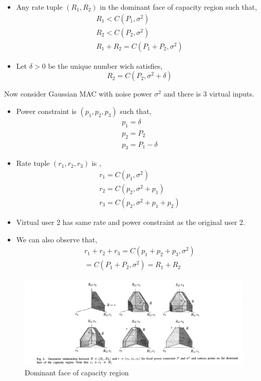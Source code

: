 \documentclass[10pt]{beamer}
\begin{document}
\begin{frame}[t]
	\begin{itemize}
	\item Any rate tuple $(R_1, R_2)$ in the dominant face of capacity region such that,
	\begin{align*}
	    R_1< C(P_1, \sigma^2)\\
		R_2 < C(P_2, \sigma^2) \\
		R_1+ R_2 = C(P_1 +P_2 , \sigma^2)
	\end{align*}
\item Let $\delta>0$ be the unique number wich satisfies,
\begin{equation}
	R_2 = C(P_2, \sigma^2 + \delta)
\end{equation}
\end{itemize}
\end{frame}
\begin{frame}[t]
	Now consider Gaussian MAC with noise power $\sigma^2$ and there is 3 virtual inputs.
	\begin{itemize}
		\item Power constraint is $(p_1,p_2,p_3)$ such that, 
		\begin{align*}
			p_1 = \delta\\ p_2 = P_2 \\ p_3 = P_1 -\delta
		\end{align*}
		\item Rate tuple $\left( r_1, r_2, r_3\right)$ is ,
		\begin{align*}
			r_1 = C(p_1,  \sigma^2)\\ r_2 = C (p_2, \sigma^2 +p_1) \\r_3 =C (p_2, \sigma^2 +p_1+p_2)
		\end{align*}
		\item Virtual user 2 has same rate and power constraint as the original user 2.
		\item We can also observe that,
		\begin{align*}
			r_1 +r_2 +r_3 = C(p_1+p_2 +p_3,  \sigma^2)\\  = C (P_1 +P_2, \sigma^2 ) = R_1 +R_2
		\end{align*}
	\end{itemize}
\end{frame}
\begin{frame}[t]
	\begin{figure}[htb!]
		\centering
		\includegraphics[height=.5\textheight]{fig_11.png}
		\caption{Dominant face of capacity region}
		\label{fig11}
	\end{figure}
\end{frame}
\end{document}
